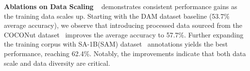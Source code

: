 \documentclass{llmxive}
\providecommand{\arraystretch}{1.3}
\begin{document}
% 


\begin{table}[htbp]
\centering
\label{tab:data_scaling_ablation}
\setlength{\tabcolsep}{6pt}
\renewcommand{\arraystretch}{1.15}
\caption{Data scaling ablations for Parallel Captioning. Increasing the amount and diversity of training data consistently improves performance.}
\end{table}

\noindent
\textbf{Ablations on Data Scaling}
~ demonstrates consistent performance gains as the training data scales up. Starting with the DAM dataset baseline (53.7\% average accuracy), we observe that introducing processed data sourced from the COCONut dataset~\citep{deng2024coconut} improves the average accuracy to 57.7\%. Further expanding the training corpus with SA-1B(SAM) dataset~\citep{carion2025sam} annotations yields the best performance, reaching 62.4\%. Notably, the improvements indicate that both data scale and data diversity are critical.
\end{document}
